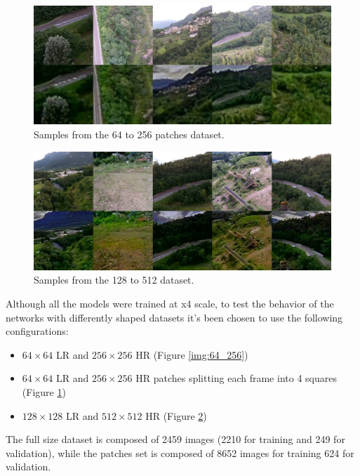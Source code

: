 \begin{figure}[H]
  \centering
  \includegraphics[width=1\textwidth]{figures/final_64_256_patches.png}
  \caption{Samples from the 64 to 256 patches dataset.}
  \label{img:64_256_p}
\end{figure}

\begin{figure}[H]
  \centering
  \includegraphics[width=1\textwidth]{figures/final_128_512.png}
  \caption{Samples from the 128 to 512 dataset.}
  \label{img:128_512}
\end{figure}


Although all the models were trained at x4 scale, to test the behavior of the networks with differently shaped datasets it's been chosen to use the following configurations:

\begin{itemize}
  \item  \(64\times64\) LR and  \(256\times256\) HR (Figure \ref{img:64_256})
  \item  \(64\times64\) LR and  \(256\times256\) HR patches splitting each frame into 4 squares (Figure \ref{img:64_256_p})
  \item  \(128\times128\) LR and  \(512\times512\) HR (Figure \ref{img:128_512})
\end{itemize}

The full size dataset is composed of 2459 images (2210 for training and 249 for validation), while the patches set is composed of 8652 images for training 624 for validation.
